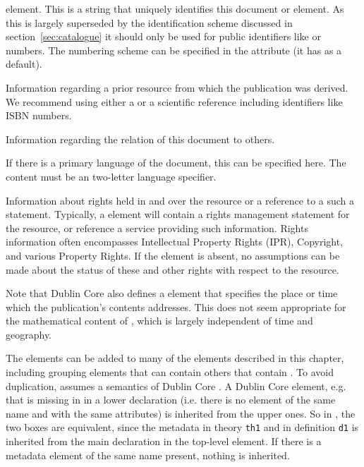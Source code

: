 \begin{description}
  element. This is a string that uniquely identifies this document or element.  As
  this is largely superseded by the identification scheme discussed in
  section~\ref{sec:catalogue} it should only be used for public identifiers like
  {} or {} numbers. The numbering scheme can be
  specified in the {} attribute (it has
  {} as a default).
\item[{\eldef{Source}}] Information regarding a prior resource from which the
  publication was derived. We recommend using either a {} or a
  scientific reference including identifiers like ISBN numbers.
\item[{\eldef{Relation}}] Information regarding the relation of this document to
  others.
\item[{\eldef{Language}}] If there is a primary language of the document, this can
  be specified here. The content must be an {} two-letter language
  specifier.
\item[{\eldef{Rights}}] Information about rights held in and over the resource or
  a reference to a such a statement. Typically, a {} element will
  contain a rights management statement for the resource, or reference a service
  providing such information. Rights information often encompasses Intellectual
  Property Rights (IPR), Copyright, and various Property Rights.  If the {}
  element is absent, no assumptions can be made about the status of these and
  other rights with respect to the resource.
\end{description}
Note that Dublin Core also defines a {} element that
specifies the place or time which the publication's contents addresses. This does
not seem appropriate for the mathematical content of {\omdoc}, which is largely
independent of time and geography.

The {} elements can be added to many of the {\omdoc} elements
described in this chapter, including grouping elements that can contain others
that contain {}. To avoid duplication, {\omdoc} assumes a
{} semantics of Dublin Core {}. A
Dublin Core element, e.g. {} that is missing in in a lower
{} declaration (i.e. there is no element of the same name and
with the same attributes) is inherited from the upper ones. So in
{}, the two boxes are equivalent, since the metadata in
theory {\tt{th1}} and in definition {\tt{d1}} is inherited from the main
declaration in the top-level {} element.  If there is a metadata
element of the same name present, nothing is inherited.

